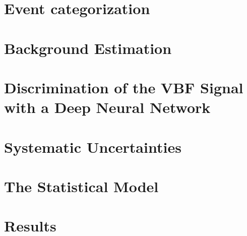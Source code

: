 \section{Event categorization}
\label{sec:event-categorization}



\section{Background Estimation}
\label{sec:bkg-estimation}


\section{Discrimination of the VBF Signal with a Deep Neural Network}
\label{sec:dnn}



\section{Systematic Uncertainties}
\label{sec:systematics}



\section{The Statistical Model}
\label{sec:stats-analysis}


\section{Results}
\label{sec:hww-results}


